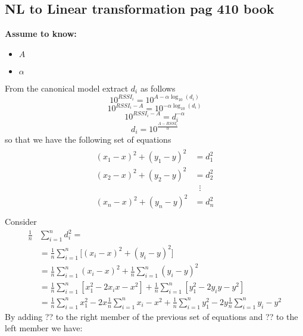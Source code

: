 \documentclass[12pt]{report}
\begin{document}
\subsection{NL to Linear transformation pag 410 book}
  \begin{center}
  \textbf{Assume to know:}
  \begin{itemize}
    \centering
    \item $A$
    \item $\alpha$
  \end{itemize}
  \end{center}
From the canonical model extract $d_i$ as follows
\begin{equation*}
    10^{RSSI_{i}}=10^{A-\alpha\log_{10}(d_i)}
\end{equation*}
\begin{equation*}
    10^{RSSI_{i}-A}=10^{-\alpha\log_{10}(d_i)}
\end{equation*}
\begin{equation*}
     10^{RSSI_{i}-A}=d_i^{-\alpha}
\end{equation*}
\begin{equation}
    d_i=10^{\frac{A-RSSI_{i}}{\alpha}}
\end{equation}
so that we have the following set of equations
\begin{align}
\begin{split} 
(x_1-x)^2+(y_1-y)^2&=d_1^2 \\ 
(x_2-x)^2+(y_2-y)^2&=d_2^2 \\ 
&\;\;\vdots\\
(x_n-x)^2+(y_n-y)^2&=d_n^2 \\
\end{split}
\end{align}
Consider 
\begin{align}
\frac{1}{n}&\sum_{i=1}^nd_i^2=\\
&=\frac{1}{n}\sum_{i=1}^n\big[(x_i-x)^2+(y_i-y)^2\big]\\
&=\frac{1}{n}\sum_{i=1}^n(x_i-x)^2+\frac{1}{n}\sum_{i=1}^n(y_i-y)^2\\
&=\frac{1}{n}\sum_{i=1}^n[x_1^2-2x_ix-x^2] + \frac{1}{n}\sum_{i=1}^n[y_1^2-2y_iy-y^2]\\
&=\frac{1}{n}\sum_{i=1}^nx_1^2-2x\frac{1}{n}\sum_{i=1}^nx_i- x^2 + \frac{1}{n}\sum_{i=1}^ny_1^2-2y\frac{1}{n}\sum_{i=1}^ny_i- y^2
\end{align}
By adding ?? to the right member of the previous set of equations and ?? to the left member we have:
\end{document}
